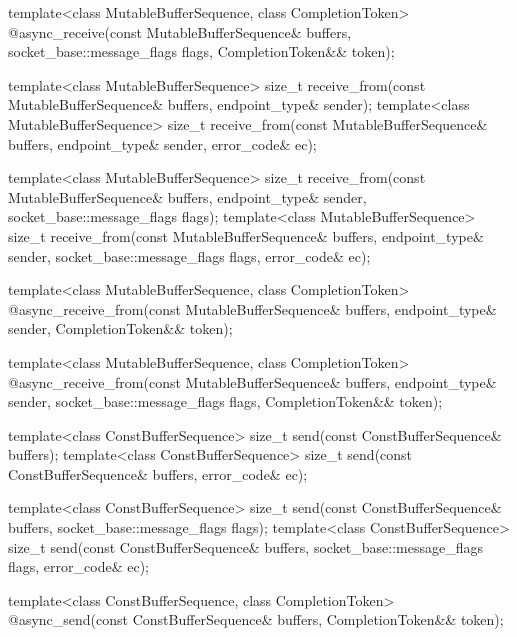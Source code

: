 \begin{codeblock}
{{{{{    template<class MutableBufferSequence, class CompletionToken>
      @\DEDUCED@ async_receive(const MutableBufferSequence& buffers,
                            socket_base::message_flags flags,
                            CompletionToken&& token);

    template<class MutableBufferSequence>
      size_t receive_from(const MutableBufferSequence& buffers,
                          endpoint_type& sender);
    template<class MutableBufferSequence>
      size_t receive_from(const MutableBufferSequence& buffers,
                          endpoint_type& sender, error_code& ec);

    template<class MutableBufferSequence>
      size_t receive_from(const MutableBufferSequence& buffers,
                          endpoint_type& sender,
                          socket_base::message_flags flags);
    template<class MutableBufferSequence>
      size_t receive_from(const MutableBufferSequence& buffers,
                          endpoint_type& sender,
                          socket_base::message_flags flags,
                          error_code& ec);

    template<class MutableBufferSequence, class CompletionToken>
      @\DEDUCED@ async_receive_from(const MutableBufferSequence& buffers,
                                 endpoint_type& sender,
                                 CompletionToken&& token);

    template<class MutableBufferSequence, class CompletionToken>
      @\DEDUCED@ async_receive_from(const MutableBufferSequence& buffers,
                                 endpoint_type& sender,
                                 socket_base::message_flags flags,
                                 CompletionToken&& token);

    template<class ConstBufferSequence>
      size_t send(const ConstBufferSequence& buffers);
    template<class ConstBufferSequence>
      size_t send(const ConstBufferSequence& buffers, error_code& ec);

    template<class ConstBufferSequence>
      size_t send(const ConstBufferSequence& buffers,
                  socket_base::message_flags flags);
    template<class ConstBufferSequence>
      size_t send(const ConstBufferSequence& buffers,
                  socket_base::message_flags flags, error_code& ec);

    template<class ConstBufferSequence, class CompletionToken>
      @\DEDUCED@ async_send(const ConstBufferSequence& buffers,
                         CompletionToken&& token);

}}}}}
\end{codeblock}

